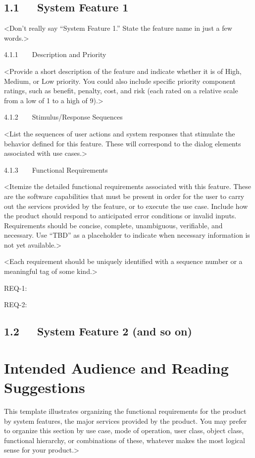 \documentclass{scrreprt}
\begin{document}
\subsection*{1.1   System Feature 1}

<Don’t really say “System Feature 1.” State the feature name in just a few words.>

4.1.1    Description and Priority

<Provide a short description of the feature and indicate whether it is of High, Medium, or Low priority. You could also include specific priority component ratings, such as benefit, penalty, cost, and risk (each rated on a relative scale from a low of 1 to a high of 9).>

4.1.2    Stimulus/Response Sequences

<List the sequences of user actions and system responses that stimulate the behavior defined for this feature. These will correspond to the dialog elements associated with use cases.>

4.1.3    Functional Requirements

<Itemize the detailed functional requirements associated with this feature. These are the software capabilities that must be present in order for the user to carry out the services provided by the feature, or to execute the use case. Include how the product should respond to anticipated error conditions or invalid inputs. Requirements should be concise, complete, unambiguous, verifiable, and necessary. Use “TBD” as a placeholder to indicate when necessary information is not yet available.>

<Each requirement should be uniquely identified with a sequence number or a meaningful tag of some kind.>

REQ-1:

REQ-2:

\subsection*{1.2   System Feature 2 (and so on)}
    \section{Intended Audience and Reading Suggestions}
    This template illustrates organizing the functional requirements for the product by system features, the major services provided by the product. You may prefer to organize this section by use case, mode of operation, user class, object class, functional hierarchy, or combinations of these, whatever makes the most logical sense for your product.>
\end{document}
